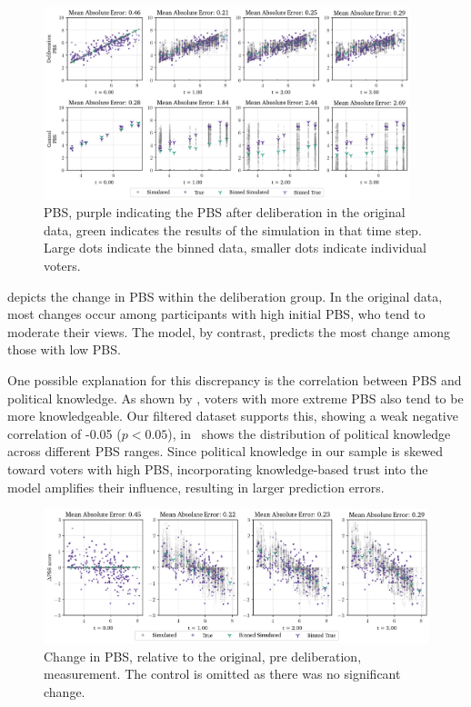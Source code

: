 \begin{figure}[ht]
	\begin{center}
		\includegraphics[width=0.95\textwidth]{Figures/pbs_scores.png}
	\end{center}
	\caption{ PBS, purple indicating the PBS after deliberation in the original data, green indicates the results of the simulation in that time step. Large dots indicate the binned data, smaller dots indicate individual voters.}\label{fig:pbs}
\end{figure}

 depicts the change in PBS within the deliberation
group. In the original data, most changes occur among participants
with high initial PBS, who tend to moderate their views. The model, by
contrast, predicts the most change among those with low PBS.

One possible explanation for this discrepancy is the correlation between PBS
and political knowledge. As shown by
\citet{fishkinCanDeliberationHave2024}, voters with more extreme PBS also tend
to be more knowledgeable. Our filtered dataset supports this, showing a weak
negative correlation of -0.05 ($p < 0.05$), 
in~ shows the distribution of political knowledge across
different PBS ranges. Since political knowledge in our sample is skewed toward
voters with high PBS, incorporating knowledge-based trust into the model
amplifies their influence, resulting in larger prediction errors.



\begin{figure}[ht]
	\begin{center}
		\includegraphics[width=\textwidth]{Figures/change_pbs_scores.png}
	\end{center}
	\caption{Change in  PBS, relative to the original, pre deliberation, measurement. The control is  omitted as there was no significant change.}\label{fig:delta_pbs}
\end{figure}


